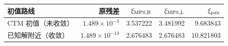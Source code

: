 \begin{tabular}{lrrrr}
\toprule
初值路线 & 原残差 & $\xi_{\rm MPS,R}$ & $\xi_{\rm MPS,L}$ & $\xi_{\rm pair}$ \\
\midrule
CTM 初值（未收敛） & $1.489\times10^{-3}$ & 3.537222 & 3.481992 & 9.683843 \\
已知解附近（收敛） & $1.489\times10^{-13}$ & 2.676483 & 2.676483 & 10.821803 \\
\bottomrule
\end{tabular}
